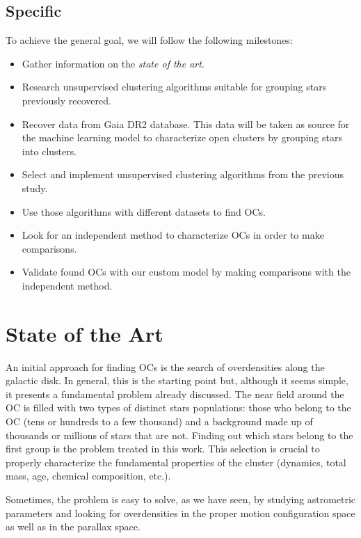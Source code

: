 \documentclass[11pt, a4paper, english]{book}
\begin{document}
\section{Specific}

To achieve the general goal, we will follow the following milestones:

\begin{itemize}
  \item Gather information on the \emph{state of the art}.
  \item Research unsupervised clustering algorithms suitable for grouping stars previously recovered.
  \item Recover data from Gaia DR2 database. This data will be taken as source for the machine learning model to characterize open clusters
  by grouping stars into clusters.
  \item Select and implement unsupervised clustering algorithms from the previous study.
  \item Use those algorithms with different datasets to find OCs.
  \item Look for an independent method to characterize OCs in order to make comparisons.
  \item Validate found OCs with our custom model by making comparisons with the independent method.
\end{itemize}

\chapter{State of the Art}


An initial approach for finding OCs is the search of overdensities along the galactic disk. In general, this is the starting point but,
although it seems simple, it presents a fundamental problem already discussed. The near field around the OC is filled with two types of
distinct stars populations: those who belong to the OC (tens or hundreds to a few thousand) and a background made up of thousands or
millions of stars that are not. Finding out which stars belong to the first group is the problem treated in this work.
This selection is crucial to properly characterize the fundamental properties of the cluster
(dynamics, total mass, age, chemical composition, etc.).

Sometimes, the problem is easy to solve, as we have seen, by studying astrometric parameters and looking for overdensities in the proper
motion configuration space as well as in the parallax space.
\end{document}

